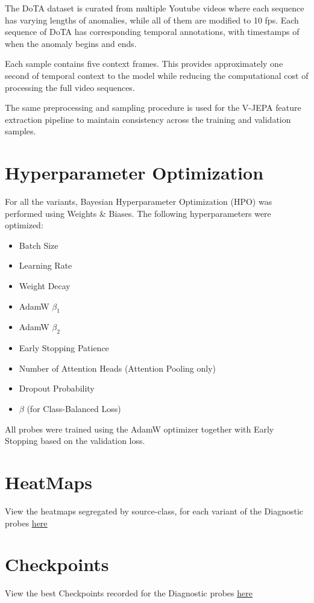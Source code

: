 \documentclass{article}
\begin{document}
The DoTA dataset is curated from multiple Youtube videos where each sequence has varying lengths of anomalies, while all of them are modified to 10 fps. Each sequence of DoTA has corresponding temporal annotations, with timestamps of when the anomaly begins and ends. 

Each sample contains five context frames. This provides approximately one second of temporal context to the model while reducing the computational cost of processing the full video sequences.

The same preprocessing and sampling procedure is used for the V-JEPA feature extraction pipeline to maintain consistency across the training and validation samples.



\section{Hyperparameter Optimization}
For all the variants, Bayesian Hyperparameter Optimization (HPO) was performed using Weights \& Biases. The following hyperparameters were optimized:

\begin{itemize}
    \item Batch Size
    \item Learning Rate
    \item Weight Decay
    \item AdamW $\beta_1$
    \item AdamW $\beta_2$
    \item Early Stopping Patience
    \item Number of Attention Heads (Attention Pooling only)
    \item Dropout Probability
    \item $\beta$ (for Class-Balanced Loss)
\end{itemize}

All probes were trained using the AdamW optimizer together with Early Stopping based on the validation loss.

\section{HeatMaps}
View the heatmaps segregated by source-class, for each variant of the Diagnostic probes \underline{\href{https://drive.google.com/drive/folders/1nYQ-vDPLmx2u-Tlx3z-k3wS5PgYqUKkz?usp=share_link}{here}}
\section{Checkpoints}
View the best Checkpoints recorded for the Diagnostic probes \underline{\href{https://drive.google.com/drive/folders/1RPixmYdDNdBwpeyYk8LFegW2MghH128q?usp=share_link}{here}}
\end{document}
